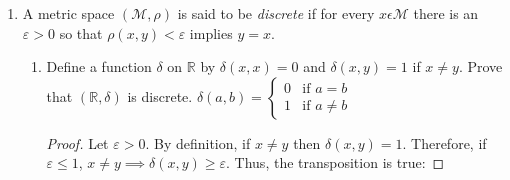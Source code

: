 \documentclass{article}
\begin{document}
\begin{enumerate}
\begin{proof}
\begin{enumerate}
                        \item $\rho_{\max}((x_1,y_1),(x_2,y_2)) = \rho_{\max}((x_2,y_2),(x_1,y_1))$
                              \medbreak
                              By definition, $\max$ is commutative and therefore $\rho_{max}$ is commutative.
                        \item $\forall(x_1,y_1),(x_2,y_2),(x_3,y_3)\in\mathbb{R}^2,\rho_{\max}((x_1,y_1),(x_3,y_3))$\\
                              \phantom{tabbing}$\leq \rho_{\max}((x_1,y_1),(x_2,y_2))+\rho_{\max}((x_2,y_2),(x_3,y_3))$
                              \begin{align*}
                                    \rho_{\max}(x_1,y_1), (x_3, y_3)) & = \max\{\lvert x_1-x_3\rvert,\lvert y_1-y_3\rvert\} \\
                                                                      & =                                                   \\%
                              \end{align*}
                  \end{enumerate}
            \end{proof}
            \setcounter{enumi}{9}
      \item A metric space $(\mathcal{M}, \rho)$ is said to be \textit{discrete}
            if for every $x\epsilon\mathcal{M}$ there is an $\varepsilon>0$ so
            that $\rho(x, y)<\varepsilon$ implies $y=x$.
            \begin{enumerate}
                  \item Define a function $\delta$ on $\mathbb{R}$ by
                        $\delta(x,x)=0$ and $\delta(x, y)=1$ if $x\neq y$. Prove
                        that $(\mathbb{R}, \delta)$ is discrete.
                        \medbreak
                        $\delta(a,b)=\begin{cases}
                                    0 & \textrm{if } a = b    \\
                                    1 & \textrm{if } a \neq b
                              \end{cases}$
                        \begin{proof}
                              Let $\varepsilon>0$. By definition, if $x\neq y$ then
                              $\delta(x,y)=1$. Therefore, if $\varepsilon\leq 1$,
                              $x\neq y\implies \delta(x,y)\geq\varepsilon$.
                              Thus, the transposition is true:

\end{proof}
\end{enumerate}
\end{enumerate}
\end{document}
